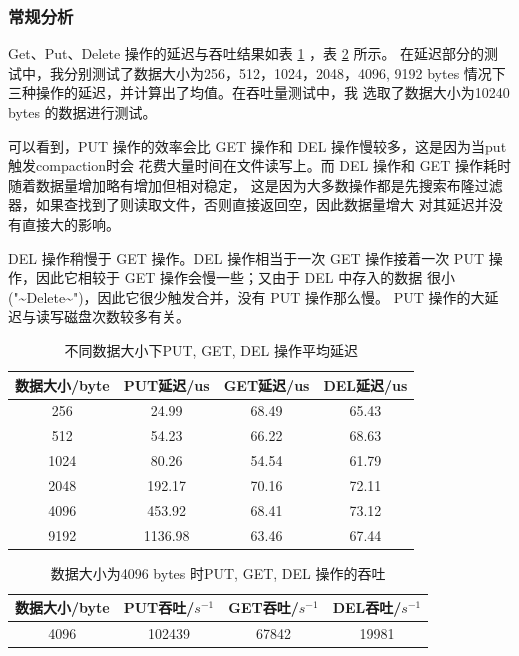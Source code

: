 \documentclass{article}
\begin{document}
\subsubsection{常规分析}
Get、Put、Delete 操作的延迟与吞吐结果如表 \ref{figure1} ，表 \ref{figure2} 所示。
在延迟部分的测试中，我分别测试了数据大小为256，512，1024，2048，4096, 9192 bytes 情况下三种操作的延迟，并计算出了均值。在吞吐量测试中，我
选取了数据大小为10240 bytes 的数据进行测试。 \par
可以看到，PUT 操作的效率会比 GET 操作和 DEL 操作慢较多，这是因为当put触发compaction时会
花费大量时间在文件读写上。而 DEL 操作和 GET 操作耗时随着数据量增加略有增加但相对稳定，
这是因为大多数操作都是先搜索布隆过滤器，如果查找到了则读取文件，否则直接返回空，因此数据量增大
对其延迟并没有直接大的影响。\par
DEL 操作稍慢于 GET 操作。DEL 操作相当于一次 GET 操作接着一次
PUT 操作，因此它相较于 GET 操作会慢一些；又由于 DEL 中存入的数据
很小("\~{}Delete\~{}")，因此它很少触发合并，没有 PUT 操作那么慢。
PUT 操作的大延迟与读写磁盘次数较多有关。\par

\begin{table}[h!]
    \begin{center}
      \caption{不同数据大小下PUT, GET, DEL 操作平均延迟}
      \label{figure1}
      \begin{tabular}{c|c|c|c}
        \textbf{数据大小/byte} & \textbf{PUT延迟/us} & \textbf{GET延迟/us} & \textbf{DEL延迟/us}\\
        \hline
        256 & 24.99 & 68.49 & 65.43 \\
        512 & 54.23 & 66.22 & 68.63 \\
        1024 & 80.26 & 54.54 & 61.79 \\
        2048 & 192.17 & 70.16 & 72.11 \\
        4096 & 453.92 & 68.41 & 73.12 \\
        9192 & 1136.98 & 63.46 & 67.44 \\
        \hline
      \end{tabular}
    \end{center}
\end{table}

\begin{table}[h!]
    \begin{center}
      \caption{数据大小为4096 bytes 时PUT, GET, DEL 操作的吞吐}
      \label{figure2}
      \begin{tabular}{c|c|c|c}
        \textbf{数据大小/byte} & \textbf{PUT吞吐/$s^{-1}$} & \textbf{GET吞吐/$s^{-1}$} & \textbf{DEL吞吐/$s^{-1}$}\\
        \hline
        4096 & 102439 & 67842 & 19981 \\ 
      \end{tabular}
    \end{center}
\end{table}
\end{document}
